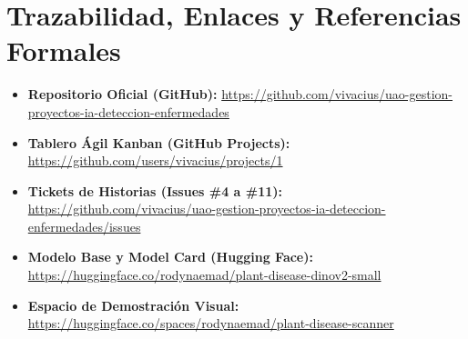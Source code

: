 \documentclass[12pt,letterpaper]{article}
\begin{document}
\FloatBarrier
\section{Trazabilidad, Enlaces y Referencias Formales}

\begingroup\sloppy
\begin{itemize}[leftmargin=*,noitemsep]
    \item \textbf{Repositorio Oficial (GitHub):} \url{https://github.com/vivacius/uao-gestion-proyectos-ia-deteccion-enfermedades}
    \item \textbf{Tablero Ágil Kanban (GitHub Projects):} \url{https://github.com/users/vivacius/projects/1}
    \item \textbf{Tickets de Historias (Issues \#4 a \#11):} \url{https://github.com/vivacius/uao-gestion-proyectos-ia-deteccion-enfermedades/issues}
    \item \textbf{Modelo Base y Model Card (Hugging Face):} \url{https://huggingface.co/rodynaemad/plant-disease-dinov2-small}
    \item \textbf{Espacio de Demostración Visual:} \url{https://huggingface.co/spaces/rodynaemad/plant-disease-scanner}
\end{itemize}
\endgroup
\end{document}
